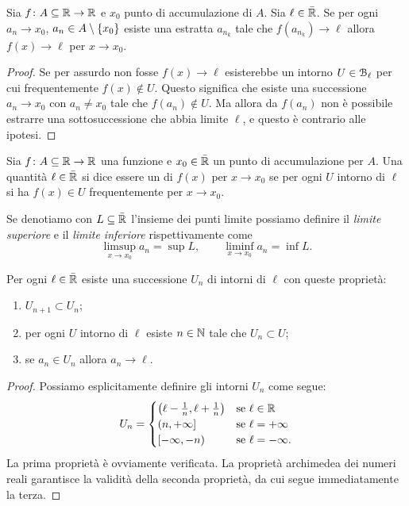   \begin{proposition}
    \label{prop:convergenza}
  Sia $f\colon A\subseteq \mathbb R\to \mathbb R$ e $x_0$ punto di accumulazione di $A$.
  Sia $\ell\in \bar {\mathbb R}$.
  Se per ogni $a_n\to x_0$, $a_n\in A\setminus{\left\{ x_0 \right\}}$
  esiste una estratta $a_{n_k}$ tale che $f(a_{n_k})\to \ell$ 
  allora $f(x)\to \ell$ per $x\to x_0$.
  \end{proposition}
  \begin{proof}
    Se per assurdo non fosse $f(x) \to \ell$
    esisterebbe un intorno $U\in \mathcal B_\ell$
    per cui frequentemente $f(x) \not \in U$.
    Questo significa che esiste una successione
    $a_n\to x_0$ con $a_n\neq x_0$ tale che $f(a_n)\not \in U$.
    Ma allora da $f(a_n)$
    non è possibile estrarre una sottosuccessione
    che abbia limite $\ell$, e questo è contrario alle
    ipotesi.
\end{proof}

\begin{definition}
Sia $f\colon A\subseteq \mathbb R \to \mathbb R$ una funzione e $x_0\in \bar {\mathbb R}$ 
un punto di accumulazione per $A$.
Una quantità $\ell\in \bar{\mathbb R}$ si dice essere
un  di $f(x)$ per $x\to x_0$ se 
per ogni $U$ intorno di $\ell$ si ha $f(x)\in U$ 
frequentemente per $x\to x_0$.

Se denotiamo con $L\subseteq \bar{\mathbb R}$ l'insieme
dei punti limite possiamo definire il \emph{limite superiore} e il
\emph{limite inferiore}
rispettivamente come
\[
\limsup_{x\to x_0} a_n = \sup L, \qquad
\liminf_{x\to x_0} a_n = \inf L.
\]
\end{definition}

\begin{proposition}%
  \label{prop:base_numerabile}%
  Per ogni $\ell\in \bar {\mathbb R}$ esiste una successione $U_n$ di intorni di $\ell$ 
  con queste proprietà:
  \begin{enumerate}
    \item $U_{n+1}\subset U_n$;
    \item per ogni $U$ intorno di $\ell$ esiste $n\in \mathbb N$ tale che $U_n\subset U$;
    \item se $a_n\in U_n$ allora $a_n\to \ell$.
  \end{enumerate}
\end{proposition}
\begin{proof}
Possiamo esplicitamente definire gli intorni $U_n$ come segue:
\[
  U_n = 
  \begin{cases}
    \left(\ell-\frac 1 n,\ell+\frac 1 n\right) & \text{se $\ell\in \mathbb R$}\\ 
    \left(n,+\infty\right] & \text{se $\ell=+\infty$}\\
    \left[-\infty,-n\right) & \text{se $\ell=-\infty$.}
  \end{cases}
\]
La prima proprietà è ovviamente verificata.
La proprietà archimedea dei numeri reali garantisce la validità della seconda 
proprietà, da cui segue immediatamente la terza.
\end{proof}

